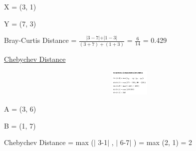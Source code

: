 \documentclass[12pt]{article}
\renewcommand{\_}{\kern-1.5pt\textunderscore\kern-1.5pt}
\begin{document}

\par

{\fontsize{14pt}{16.8pt}\selectfont X = (3, 1)\par}\par

{\fontsize{14pt}{16.8pt}\selectfont Y = (7, 3)\par}\par

{\fontsize{14pt}{16.8pt}\selectfont Bray-Curtis Distance =  \( \frac{ \vert 3-7 \vert + \vert 1-3 \vert }{ \left( 3+7 \right) + \left( 1+3 \right) } \)  =  \( \frac{6}{14} \)  = 0.429\par}\par

{\fontsize{14pt}{16.8pt}\selectfont \uline{Chebychev Distance}\par}\par


\vspace{\baselineskip}



\begin{figure}[H]
	\begin{Center}
		\includegraphics[width=5.13in,height=0.5in]{./media/image12.png}
	\end{Center}
\end{figure}



\par

{\fontsize{14pt}{16.8pt}\selectfont A = (3, 6)\par}\par

{\fontsize{14pt}{16.8pt}\selectfont B = (1, 7)\par}\par

{\fontsize{14pt}{16.8pt}\selectfont Chebychev Distance = max ($ \vert $ 3-1$ \vert $ , $ \vert $ 6-7$ \vert $ ) = max (2, 1) = 2\par}\par
\end{document}
